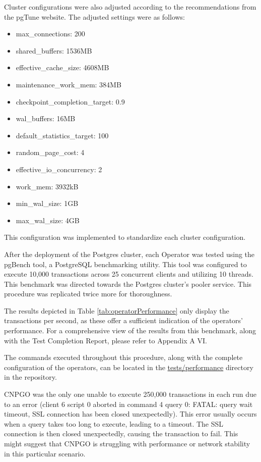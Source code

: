 Cluster configurations were also adjusted according to the recommendations from the pgTune website. The adjusted settings were as follows:
\begin{itemize}
    \item max\_connections: 200
    \item shared\_buffers: 1536MB
    \item effective\_cache\_size: 4608MB
    \item maintenance\_work\_mem: 384MB
    \item checkpoint\_completion\_target: 0.9
    \item wal\_buffers: 16MB
    \item default\_statistics\_target: 100
    \item random\_page\_cost: 4
    \item effective\_io\_concurrency: 2
    \item work\_mem: 3932kB
    \item min\_wal\_size: 1GB
    \item max\_wal\_size: 4GB
\end{itemize}

This configuration was implemented to standardize each cluster configuration.

After the deployment of the Postgres cluster, each Operator was tested using the pgBench tool, a PostgreSQL benchmarking utility. This tool was configured to execute 10,000 transactions across 25 concurrent clients and utilizing 10 threads. This benchmark was directed towards the Postgres cluster's pooler service. This procedure was replicated twice more for thoroughness.

The results depicted in Table \ref{tab:operatorPerformance} only display the transactions per second, as these offer a sufficient indication of the operators' performance. For a comprehensive view of the results from this benchmark, along with the Test Completion Report, please refer to Appendix A VI.

The commands executed throughout this procedure, along with the complete configuration of the operators, can be located in the \url{tests/performance} directory in the repository.

CNPGO was the only one unable to execute 250,000 transactions in each run due to an error (client 6 script 0 aborted in command 4 query 0: FATAL: query wait timeout, SSL connection has been closed unexpectedly).
This error usually occurs when a query takes too long to execute, leading to a timeout. The SSL connection is then closed unexpectedly, causing the transaction to fail. This might suggest that CNPGO is struggling with performance or network stability in this particular scenario.

